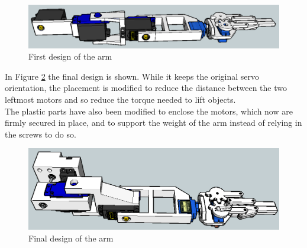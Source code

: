 	\begin{figure}[H]
			\centering
			\includegraphics[scale=0.4]{images/Diagrams/firstArm}
			\caption{First design of the arm}
			\label{firstArm}
	\end{figure}
	\bigskip

In Figure \ref{finalArm} the final design is shown. While it keeps the original servo orientation, the placement is modified to reduce the distance between the two leftmost motors and so reduce the torque needed to lift objects. \\
The plastic parts have also been modified to enclose the motors, which now are firmly secured in place, and to support the weight of the arm instead of relying in the screws to do so.

	\begin{figure}[H]
			\centering
			\includegraphics[scale=0.4]{images/Diagrams/finalArm}
			\caption{Final design of the arm}
			\label{finalArm}
	\end{figure}
	\bigskip

